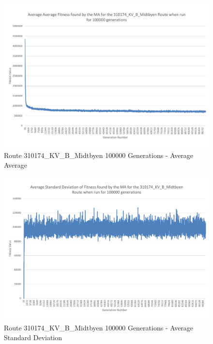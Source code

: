 \begin{landscape}
\begin{figure}[thbp]
	\centerline{\includegraphics[height=0.945\textwidth]{figures/Trondheim_graphs/KV_B/KV_B-100k_average_average.pdf}}
	\caption{Route 310174\_KV\_B\_Midtbyen 100000 Generations - Average Average}
	\label{fig:KV_B_100k_aa}
\end{figure}
\end{landscape}

\begin{landscape}
\begin{figure}[thbp]
	\centerline{\includegraphics[height=0.945\textwidth]{figures/Trondheim_graphs/KV_B/KV_B-100k_average_standard_deviation.pdf}}
	\caption{Route 310174\_KV\_B\_Midtbyen 100000 Generations - Average Standard Deviation}
	\label{fig:KV_B_100k_astd}
\end{figure}
\end{landscape}

